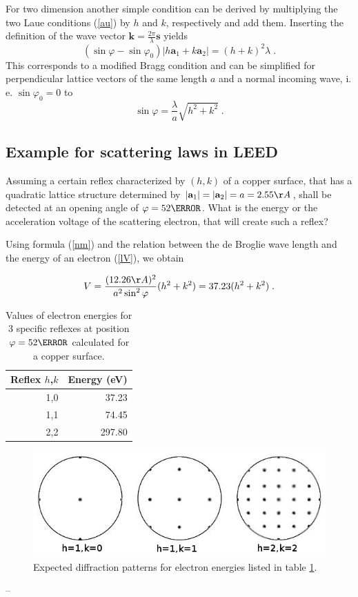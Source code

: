 \documentclass[a4paper]{scrartcl}
\numberwithin{equation}{section}
\numberwithin{figure}{section}
\numberwithin{table}{section}
\newcommand{\eq}[2]{\begin{equation}#1\label{#2}\end{equation}}
\newcommand{\Formel}[1]{(\ref{#1})}
\newcommand{\ve}[1]{\mathbf{ #1} }
\begin{document}
For two dimension another simple condition can be derived by multiplying the two Laue conditions \Formel{au} by $h$ and $k$, respectively and add them. Inserting the definition of the wave vector $\ve k=\frac{2\pi}{\lambda} \ve s$ yields
\eq{(\sin \varphi - \sin \varphi_0) |h \ve a_1 + k \ve a_2| = (h + k)^2 \lambda \; .} {}
This corresponds to a modified Bragg condition and can be simplified for perpendicular lattice vectors of the same length $a$ and a normal incoming wave, i. e. $\sin \varphi_0  =0$ to
\eq{\sin \varphi =\frac{\lambda}{a} \sqrt{h^2+k^2} \; .}{nm}

\subsection{Example for scattering laws in LEED}
Assuming a certain reflex characterized by $(h,k)$ of a copper surface, that has a quadratic lattice structure determined by $|\ve a_1|=|\ve a_2|=a=2.55 \AA$, shall be detected at an opening angle of $\varphi = 52 \degree$. What is the energy or the acceleration voltage of the scattering electron, that will create such a reflex?

Using formula \Formel{nm} and the relation between the de Broglie wave length and the energy of an electron \Formel{lV}, we obtain

\eq{ V =\frac{(12.26 \AA)^2}{a^2 \sin^2 \varphi} (h^2+k^2) = 37.23 (h^2 +k^2) \; .}{V}

\begin{table}[!h]
\centering
\begin{tabular}{rr}
\toprule
Reflex $h$,$k$ & Energy (eV) \\
\midrule
1,0 & 37.23 \\
1,1 & 74.45 \\
2,2 & 297.80 \\
 \bottomrule
\end{tabular}
\caption{\small Values of electron energies for 3 specific reflexes at position $\varphi =52\degree$ calculated for a copper surface. }
\label{kll}
\end{table}

\begin{figure}
  \centering
   	\includegraphics[width=0.7\linewidth]{pic/52.jpeg}

 \caption{\small Expected diffraction patterns for electron energies listed in table \ref{kll}.}
        \label{fig:bragg2}
\end{figure}
--
\end{document}
